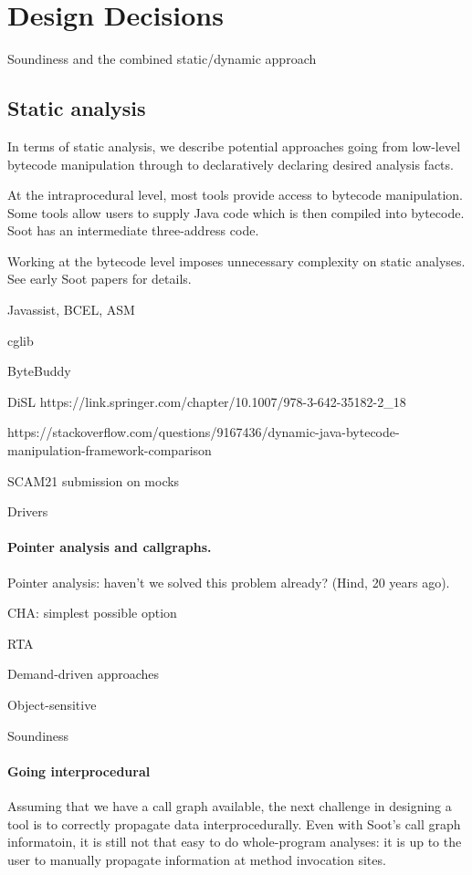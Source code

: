 \section{Design Decisions}
\label{sec:design-decisions}

Soundiness and the combined static/dynamic approach

\subsection{Static analysis}
In terms of static analysis, we describe potential approaches going
from low-level bytecode manipulation through to declaratively declaring
desired analysis facts.

At the intraprocedural level, most tools provide access to bytecode
manipulation. Some tools allow users to supply Java code which is
then compiled into bytecode. Soot has an intermediate three-address code.

Working at the bytecode level imposes unnecessary complexity on
static analyses. See early Soot papers for details.

Javassist, BCEL, ASM

cglib

ByteBuddy


DiSL https://link.springer.com/chapter/10.1007/978-3-642-35182-2_18

https://stackoverflow.com/questions/9167436/dynamic-java-bytecode-manipulation-framework-comparison



SCAM21 submission on mocks


Drivers

\paragraph{Pointer analysis and callgraphs.}

Pointer analysis: haven't we solved this problem already? (Hind, 20 years ago).

CHA: simplest possible option

RTA

Demand-driven approaches

Object-sensitive

Soundiness

\paragraph{Going interprocedural}
Assuming that we have a call graph available, the next challenge in
designing a tool is to correctly propagate data interprocedurally.
Even with Soot's call graph informatoin, it is still not that easy to
do whole-program analyses: it is up to the user to manually propagate
information at method invocation sites.

